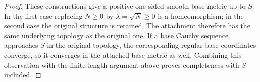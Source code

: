 \begin{proof}
These constructions give a positive one-sided smooth base metric
up to $S$. In the first case replacing $N\ge0$ by
$\lambda=\sqrt N\ge0$ is a homeomorphism; in the second case the
original structure is retained. The attachment therefore has the
same underlying topology as the original one. If a base Cauchy
sequence approaches $S$ in the original topology, the corresponding
regular base coordinates converge, so it converges in the attached
base metric as well. Combining this observation with the
finite-length argument above proves completeness with $S$ included.
\end{proof}
